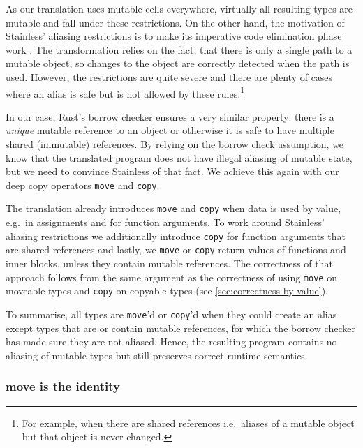 As our translation uses mutable cells everywhere, virtually all
resulting types are mutable and fall under these restrictions. On the
other hand, the motivation of Stainless' aliasing restrictions is to
make its imperative code elimination phase work \cite{regb}. The
transformation relies on the fact, that there is only a single path to a
mutable object, so changes to the object are correctly detected when the
path is used. However, the restrictions are quite severe and there are
plenty of cases where an alias is safe but is not allowed by these
rules.\footnote{For example, when there are shared references i.e.~aliases of a
mutable object but that object is never changed.}

In our case, Rust's borrow checker ensures a very similar property:
there is a \emph{unique} mutable reference to an object or otherwise it
is safe to have multiple shared (immutable) references. By relying on
the borrow check assumption, we know that the translated program does
not have illegal aliasing of mutable state, but we need to convince
Stainless of that fact. We achieve this again with our deep copy
operators \passthrough{\lstinline!move!} and
\passthrough{\lstinline!copy!}.

The translation already introduces \passthrough{\lstinline!move!} and
\passthrough{\lstinline!copy!} when data is used by value, e.g.~in assignments
and for function arguments. To work around Stainless' aliasing restrictions we
additionally introduce \passthrough{\lstinline!copy!} for function arguments
that are shared references and lastly, we \passthrough{\lstinline!move!} or
\passthrough{\lstinline!copy!} return values of functions and inner blocks,
unless they contain mutable references. The correctness of that approach follows
from the same argument as the correctness of using \lstinline!move! on moveable
types and \lstinline!copy! on copyable types (see
\autoref{sec:correctness-by-value}).

To summarise, all types are \passthrough{\lstinline!move!}'d or
\passthrough{\lstinline!copy!}'d when they could create an alias except
types that are or contain mutable references, for which the borrow
checker has made sure they are not aliased. Hence, the resulting program
contains no aliasing of mutable types but still preserves correct
runtime semantics.

\subsubsection{move is the identity}

